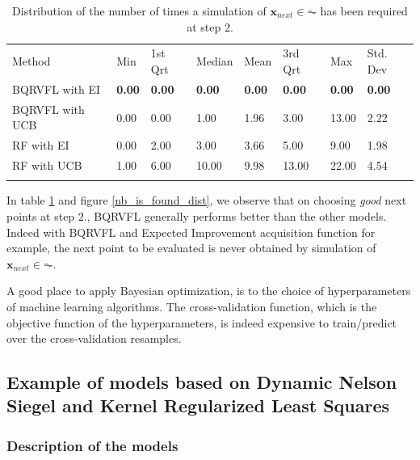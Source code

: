 \newpage

\begin{table}[!htb]
\begin{center}
\caption{Distribution of the number of times a simulation of $\textbf{x}_{next} \in \AC$ has been required at step 2.}
\label{tab:nb_sims}       %
\begin{tabular}{llllllll}
\hline\noalign{\smallskip}
Method & Min & 1st Qrt  & Median & Mean  & 3rd Qrt  & Max & Std. Dev \\
\noalign{\smallskip}\hline\noalign{\smallskip}
 BQRVFL with EI  & \textbf{0.00} & \textbf{0.00} & \textbf{0.00}  & \textbf{0.00} & \textbf{0.00} & \textbf{0.00}  & \textbf{0.00} \\
 BQRVFL with UCB & 0.00 & 0.00 & 1.00  & 1.96 & 3.00 & 13.00 & 2.22 \\
 RF with EI      & 0.00 & 2.00 & 3.00  & 3.66 & 5.00 & 9.00 & 1.98 \\
 RF with UCB     & 1.00 & 6.00 & 10.00 & 9.98 & 13.00 & 22.00 & 4.54 \\
\noalign{\smallskip}\hline
\end{tabular}
\end{center}
\end{table}

In table \ref{tab:nb_sims} and figure \ref{nb_is_found_dist}, we observe that on choosing \textit{good} next points at step $2.$, BQRVFL generally performs better than the other models. Indeed with BQRVFL and Expected Improvement acquisition function for example, the next point to be evaluated is never obtained by simulation of $\textbf{x}_{next} \in \AC$. 


A good place to apply Bayesian optimization, is to the choice of hyperparameters of machine learning algorithms. The cross-validation function, which is the objective function of the hyperparameters, is indeed expensive to train/predict over the cross-validation resamples.  

\subsection{Example of models based on Dynamic Nelson Siegel and Kernel Regularized Least Squares}

\subsubsection{Description of the models}

